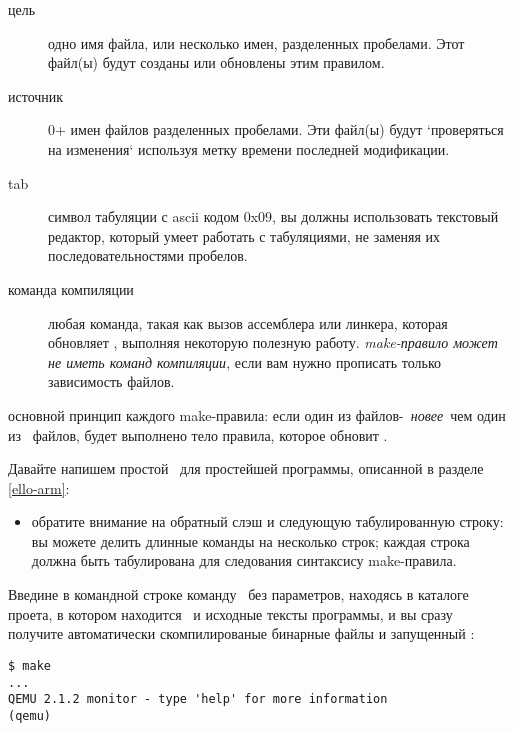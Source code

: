 \begin{description}
\item[цель] одно имя файла, или несколько имен, разделенных пробелами. Этот
файл(ы) будут созданы или обновлены этим правилом.

\item[источник] 0+ имен файлов разделенных пробелами. Эти файл(ы) будут
`проверяться на изменения` используя метку времени последней модификации.

\item[tab] символ табуляции с ascii кодом 0x09, вы должны использовать
текстовый редактор, который умеет работать с табуляциями, не заменяя их
последовательностями пробелов. 

\item[команда компиляции] любая команда, такая как вызов ассемблера или
линкера, которая обновляет , выполняя некоторую полезную работу.
\emph{make-правило может не иметь команд компиляции}, если вам нужно 
прописать только зависимость файлов.

\end{description}

\begin{framed}
основной принцип каждого make-правила: если один из файлов-\
\emph{новее}\ чем один из \ файлов, будет выполнено тело
правила, которое обновит \term{цели}.
\end{framed}

Давайте напишем простой \ для простейшей программы, описанной в
разделе \ref{ello-arm}:


\begin{itemize}
  \item обратите внимание на обратный слэш и следующую табулированную строку:
вы можете делить длинные команды на несколько строк; каждая строка должна быть
табулирована для следования синтаксису make-правила.
\end{itemize}

Введине в командной строке команду \ без параметров, находясь в
каталоге проета, в котором находится \file{Makefile}\ и исходные тексты
программы, и вы сразу получите автоматически скомпилированые бинарные файлы и 
запущенный \qemu:

\begin{verbatim}
$ make
...
QEMU 2.1.2 monitor - type 'help' for more information
(qemu)
\end{verbatim}

